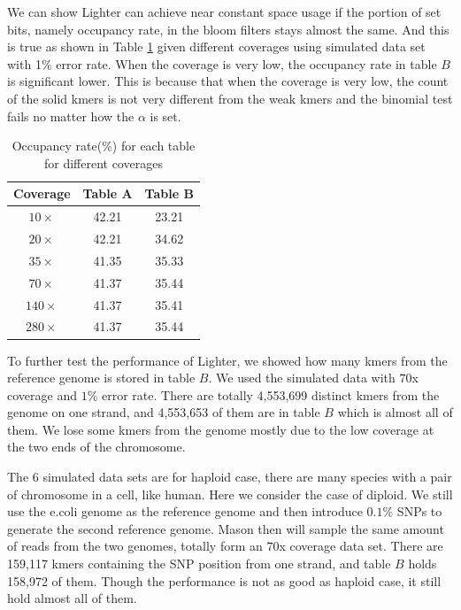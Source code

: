 \documentclass[10pt]{article}
\begin{document}
We can show Lighter can achieve near constant space usage if the portion of set bits, namely occupancy rate, in the bloom filters stays almost the same. And this is true as shown in Table \ref{table:bloom_occupancy_coverage} given different coverages using simulated data set with 1\% error rate. When the coverage is very low, the occupancy rate in table $B$ is significant lower. This is because that when the coverage is very low, the count of the solid kmers is not very different from the weak kmers and the binomial test fails no matter how the $\alpha$ is set.

\begin{table}
\begin{tabular}{|c|c|c|}\hline
Coverage & Table A & Table B \\ \hline
$10\times$	& 42.21	& 23.21 \\ \hline
$20\times$	& 42.21	& 34.62  \\ \hline
$35\times$ & 41.35 & 35.33 \\ \hline
$70\times$ &41.37  &  35.44 \\ \hline
$140\times$ & 41.37	& 35.41 \\ \hline
$280\times$ & 41.37	& 35.44 \\ \hline
\end{tabular}
\caption{Occupancy rate(\%) for each table for different coverages\label{table:bloom_occupancy_coverage}}
\end{table}

To further test the performance of Lighter, we showed how many kmers from the reference genome is stored in table $B$. We used the simulated data with $70$x coverage and $1\%$ error rate. There are totally 4,553,699 distinct kmers from the genome on one strand, and 4,553,653 of them are in table $B$ which is almost all of them. We lose some kmers from the genome mostly due to the low coverage at the two ends of the chromosome.

The 6 simulated data sets are for haploid case, there are many species with a pair of chromosome in a cell, like human. Here we consider the case of diploid. We still use the e.coli genome as the reference genome and then introduce $0.1\%$ SNPs to generate the second reference genome. Mason then will sample the same amount of reads from the two genomes, totally form an $70$x coverage data set. There are 159,117 kmers containing the SNP position from one strand, and table $B$ holds 158,972 of them. Though the performance is not as good as haploid case, it still hold almost all of them. 
\end{document}
